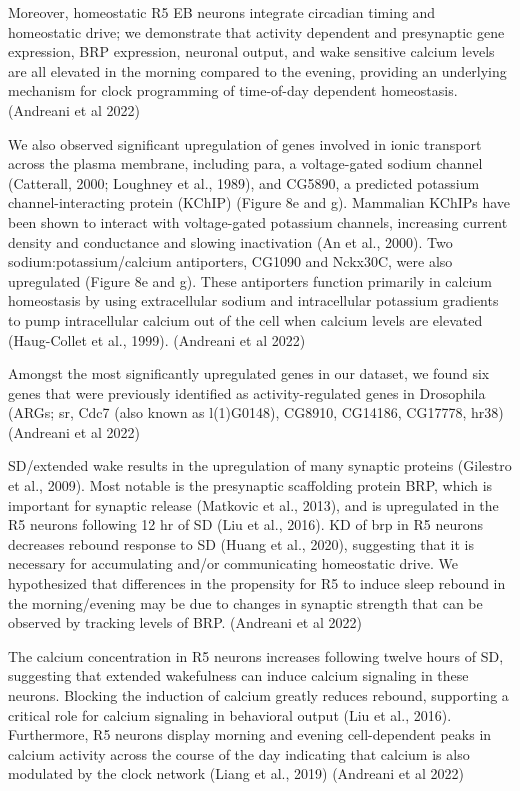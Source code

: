     Moreover, homeostatic R5 EB neurons integrate circadian timing and homeostatic drive; we demonstrate that activity dependent and presynaptic gene expression, BRP expression, neuronal output, and wake sensitive calcium levels are all elevated in the morning compared to the evening, providing an underlying mechanism for clock programming of time-of-day dependent homeostasis.
    \parencite{andreaniCircadianProgrammingEllipsoid2022} (Andreani et al 2022)

    We also observed significant upregulation of genes involved in ionic transport across the plasma membrane, including para, a voltage-gated sodium channel (Catterall, 2000; Loughney et al., 1989), and CG5890, a predicted potassium channel-interacting protein (KChIP) (Figure 8e and g). Mammalian KChIPs have been shown to interact with voltage-gated potassium channels, increasing current density and conductance and slowing inactivation (An et al., 2000). Two sodium:potassium/calcium antiporters, CG1090 and Nckx30C, were also upregulated (Figure 8e and g). These antiporters function primarily in calcium homeostasis by using extracellular sodium and intracellular potassium gradients to pump intracellular calcium out of the cell when calcium levels are elevated (Haug-Collet et al., 1999).
    \parencite{andreaniCircadianProgrammingEllipsoid2022} (Andreani et al 2022)

    Amongst the most significantly upregulated genes in our dataset, we found six genes that were previously identified as activity-regulated genes in Drosophila (ARGs; sr, Cdc7 (also known as l(1)G0148), CG8910, CG14186, CG17778, hr38)
    \parencite{andreaniCircadianProgrammingEllipsoid2022} (Andreani et al 2022)

    SD/extended wake results in the upregulation of many synaptic proteins (Gilestro et al., 2009). Most notable is the presynaptic scaffolding protein BRP, which is important for synaptic release (Matkovic et al., 2013), and is upregulated in the R5 neurons following 12 hr of SD (Liu et al., 2016). KD of brp in R5 neurons decreases rebound response to SD (Huang et al., 2020), suggesting that it is necessary for accumulating and/or communicating homeostatic drive. We hypothesized that differences in the propensity for R5 to induce sleep rebound in the morning/evening may be due to changes in synaptic strength that can be observed by tracking levels of BRP.
    \parencite{andreaniCircadianProgrammingEllipsoid2022} (Andreani et al 2022)

    The calcium concentration in R5 neurons increases following twelve hours of SD, suggesting that extended wakefulness can induce calcium signaling in these neurons. Blocking the induction of calcium greatly reduces rebound, supporting a critical role for calcium signaling in behavioral output (Liu et al., 2016). Furthermore, R5 neurons display morning and evening cell-dependent peaks in calcium activity across the course of the day indicating that calcium is also modulated by the clock network (Liang et al., 2019)
    \parencite{andreaniCircadianProgrammingEllipsoid2022} (Andreani et al 2022)


